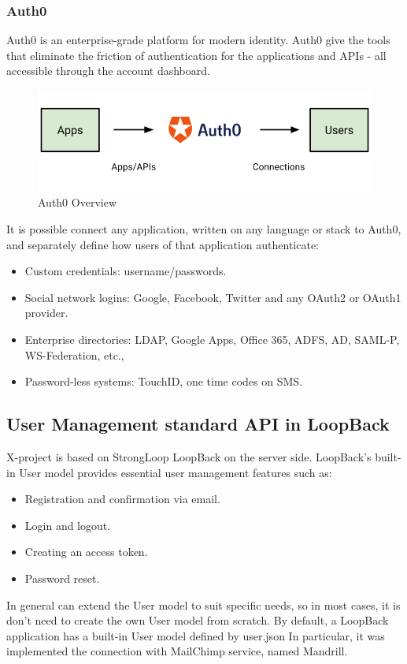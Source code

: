 \subsubsection{Auth0}

Auth0 is an enterprise-grade platform for modern identity.
Auth0 give the tools that eliminate the friction of authentication for the applications and APIs - all accessible through the account dashboard.\cite{usr_auth0}

\begin {figure}[h]
\graphicspath{{images/chapter_USR/}}
\includegraphics[width=\textwidth]{auth0}
\caption{Auth0 Overview}
\end {figure}

It is possible connect any application, written on any language or stack to Auth0, and separately define how users of that application authenticate:

\begin{itemize}
\item Custom credentials: username/passwords.
\item Social network logins: Google, Facebook, Twitter and any OAuth2 or OAuth1 provider.
\item Enterprise directories: LDAP, Google Apps, Office 365, ADFS, AD, SAML-P, WS-Federation, etc.,
\item Password-less systems: TouchID, one time codes on SMS.
\end{itemize}


\subsection{User Management standard API in LoopBack}

X-project is based on StrongLoop LoopBack on the server side.
LoopBack's built-in User model provides essential user management features such as:
\begin{itemize}
\item Registration and confirmation via email.
\item Login and logout.
\item Creating an access token.
\item Password reset. 
\end{itemize}
In general can extend the User model to suit specific needs, so in most cases, it is don't need to create the own User model from scratch.
By default, a LoopBack application has a built-in User model defined by user.json
In particular, it was implemented the connection with MailChimp service, named Mandrill.

